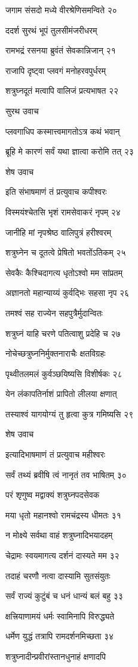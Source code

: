 जगाम संसदो मध्ये वीरश्रेणिसमन्विते २०

ददर्श सुरथं भूपं तुलसीमंजरीधरम्

रामभद्रं रसनया ब्रुवंतं सेवकान्निजान् २१

राजापि दृष्ट्वा प्लवगं मनोहरवपुर्धरम्

शत्रुघ्नदूतं मत्वापि वालिजं प्रत्यभाषत २२

सुरथ उवाच

प्लवगाधिप कस्मात्त्वमागतोऽत्र कथं भवान्

ब्रूहि मे कारणं सर्वं यथा ज्ञात्वा करोमि तत् २३

शेष उवाच

इति संभाषमाणं तं प्रत्युवाच कपीश्वरः

विस्मयंश्चेतसि भृशं रामसेवाकरं नृपम् २४

जानीहि मां नृपश्रेष्ठ वालिपुत्रं हरीश्वरम्

शत्रुघ्नेन च दूतत्वे प्रेषितो भवतोंऽतिकम् २५

सेवकैः कैश्चिदागत्य धृतोऽश्वो मम सांप्रतम्

अज्ञानतो महान्याय्यं कुर्वद्भिः सहसा नृप २६

तमश्वं सह राज्येन सहपुत्रैर्मुदान्वितः

शत्रुघ्नं याहि चरणे पतित्वाशु प्रदेहि च २७

नोचेच्छत्रुघ्ननिर्मुक्तनाराचैः क्षतविग्रहः

पृथ्वीतलमलं कुर्वञ्छयिष्यसि विशीर्षकः २८

येन लंकापतिर्नाशं प्रापितो लीलया क्षणात्

तस्याश्वं यागयोग्यं तु हृत्वा कुत्र गमिष्यसि २९

शेष उवाच

इत्यादिभाषमाणं तं प्रत्युवाच महीश्वरः

सर्वं तथ्यं ब्रवीषि त्वं नानृतं तव भाषितम् ३०

परं शृणुष्व मद्वाक्यं शत्रुघ्नपदसेवक

मया धृतो महानश्वो रामचंद्रस्य धीमतः ३१

न मोक्ष्ये सर्वथा वाहं शत्रुघ्नादिभयादहम्

चेद्रामः स्वयमागत्य दर्शनं दास्यते मम ३२

तदाहं चरणौ नत्वा दास्यामि सुतसंयुतः

सर्वं राज्यं कुटुंबं च धनं धान्यं बलं बहु ३३

क्षत्त्रियाणामयं धर्मः स्वामिनापि विरुद्ध्यते

धर्मेण युद्धं तत्रापि रामदर्शनमिच्छता ३४

शत्रुघ्नादीन्प्रवीरांस्तानधुनाहं क्षणादपि

